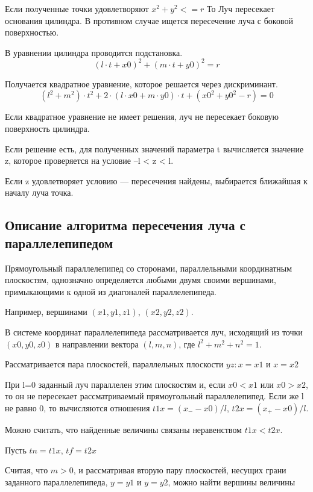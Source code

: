 Если полученные точки удовлетворяют $x^2 + y^2 <= r$ То Луч пересекает основания цилиндра. В противном случае ищется пересечение луча с боковой поверхностью.

В уравнении цилиндра проводится подстановка.
\begin{equation*}
(l \cdot t + x0)^2 + (m \cdot t + y0)^2 = r
\end{equation*}

Получается квадратное уравнение, которое решается через дискриминант.
\begin{equation}
	(l^2 + m^2) \cdot t^2 + 2 \cdot (l \cdot x0 + m \cdot y0) \cdot t + (x0^2 + y0^2 - r) = 0
\end{equation}

Если квадратное уравнение не имеет решения, луч не пересекает боковую поверхность цилиндра.

Если решение есть, для полученных значений параметра t вычисляется значение z, которое проверяется на условие --l < z < l.

Если z удовлетворяет условию --- пересечения найдены, выбирается ближайшая к началу луча точка.

\subsection{Описание алгоритма пересечения луча с параллелепипедом}

Прямоугольный параллелепипед со сторонами, параллельными координатным плоскостям, однозначно определяется любыми двумя своими вершинами, примыкающими к одной из диагоналей параллелепипеда.

Например, вершинами $(x1, y1, z1)$, $(x2, y2, z2)$.

В системе координат параллелепипеда рассматривается луч, исходящий из точки $(x0, y0, z0)$ в направлении вектора $(l, m, n)$, где $l^2 + m^2 + n^2 = 1$.

Рассматривается пара плоскостей, параллельных плоскости $yz: x = x1$ и $x = x2$

При l=0 заданный луч параллелен этим плоскостям и, если $x0 < x1$ или $x0 > x2$, то он не пересекает рассматриваемый прямоугольный параллелепипед. Если же l не равно 0, то вычисляются отношения $t1x = (x_{-} - x0)/l$, $t2x = (x_{+} - x0)/l$.

Можно считать, что найденные величины связаны неравенством $t1x < t2x$.

Пусть $tn = t1x$, $tf = t2x$

Считая, что $m > 0$, и рассматривая вторую пару плоскостей, несущих грани заданного параллелепипеда, $y = y1$ и $y = y2$, можно найти вершины величины

